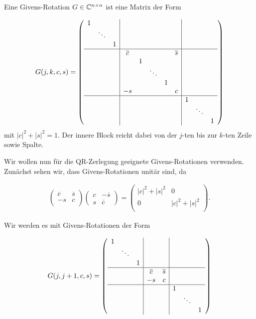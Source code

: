 \documentclass{article}
\begin{document}
\begin{definition}
	Eine Givens-Rotation $G \in \mathbb{C}^{n\times n}$ ist eine Matrix der Form

	\begin{align*}
	G(j,k,c,s)  = \left(\begin{array}{ccc|ccccc|ccc}
	1 &  &  & & & & & & &\\
	& \ddots & & & & & & & & &\\
	& & 1 & & & & & & & \\
	\hline
	& & &  \overline{c} & & & & \overline{s} & & &\\
	& & & & 1 & & & & & &\\
	& & & & & \ddots & & & & &\\
	& & & & &  &1 & & & &\\
	& & & -s & & & & c & & &\\
	\hline
	& & & & & & & & 1 & &\\
	& & & & & & & & & \ddots &\\
	& & & & & & & & & & 1\\
	\end{array}\right)
	\end{align*}
	mit $|c|^2 + |s|^2 = 1$. Der innere Block reicht dabei von der $j$-ten bis zur $k$-ten Zeile sowie Spalte.
\end{definition}


Wir wollen nun für die QR-Zerlegung geeignete Givens-Rotationen verwenden. Zunächst sehen wir, dass Givens-Rotationen unitär sind, da

\begin{align*}
\left(\begin{array}{cc}
\overline{c}& \overline{s} \\
-s & c\\
\end{array}\right)\left(\begin{array}{cc}
c & -\overline{s} \\
s & \overline{c}
\end{array}\right)
=
\left(\begin{array}{cc}
|c|^2 + |s|^2 & 0 \\
0 & |c|^2 + |s|^2 \\
\end{array}\right).
\end{align*}


Wir werden es mit Givens-Rotationen der Form

$$
G(j,j+1,c,s) =
    \left(\begin{array}{ccc|cc|ccc}
    1 & & & & & & & \\
    & \ddots & & & & & & \\
    & & 1 & & & & & \\
    \hline
    & & & \overline{c} & \overline{s} & & & \\
    & & & -s & c & & &\\
    \hline
    & & & & & 1 & & \\
    & & & & & & \ddots & \\
    & & & & & & & 1\\
    \end{array}\right)
$$
\end{document}
